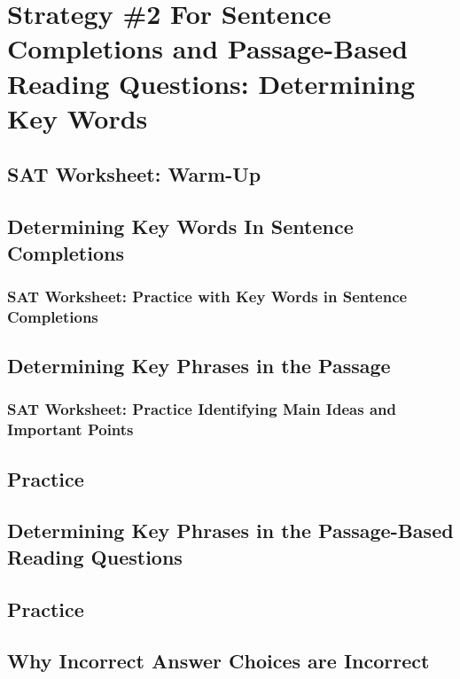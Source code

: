 \chapter{Strategy \#2 For Sentence Completions and Passage-Based Reading Questions: Determining Key Words}

\section{SAT Worksheet: Warm-Up}
\section{Determining Key Words In Sentence Completions}
\subsection{SAT Worksheet: Practice with Key Words in Sentence Completions}
\section{Determining Key Phrases in the Passage}
\subsection{SAT Worksheet: Practice Identifying Main Ideas and Important Points}
\section{Practice}
\section{Determining Key Phrases in the Passage-Based Reading Questions}
\section{Practice}
\section{Why Incorrect Answer Choices are Incorrect}